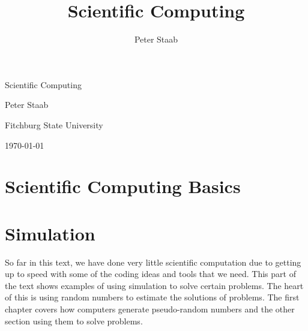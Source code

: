 \documentclass[display=portrait]{mathbook}
\title{Scientific Computing}
\author{Peter Staab}
\theoremstyle{plain}
\begin{document}
\begin{titlepage}

\begin{center}
{  
Scientific Computing}

\vspace{0.5in}

{  Peter Staab}

\vspace{0.25in}


{ Fitchburg State University} 
 
\vfill
 
{ \sffamily \today}
 
\end{center}
 
\end{titlepage}

\vfill 


%
% 



 
\frontmatter
\setcounter{tocdepth}{1}

\tableofcontents



\mainmatter

\setcounter{chapter}{0}
 
\part{Scientific Computing Basics}















\part{Simulation}

So far in this text, we have done very little scientific computation due to getting up to speed with some of the coding ideas and tools that we need.  This part of the text shows examples of using simulation to solve certain problems.  The heart of this is using random numbers to estimate the solutions of problems.  The first chapter covers how computers generate pseudo-random numbers and the other section using them to solve problems.
\end{document}
